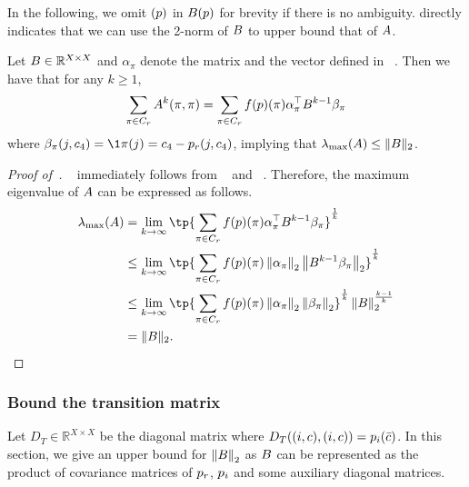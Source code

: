 \documentclass[a4paper,11pt]{article}
\renewcommand{\norm}[1]{\left\|#1\right\|}
\begin{document}
In the following, we omit $(\*p)$ in $\*B(\*p)$ for brevity if there is no ambiguity.  directly indicates that we can use the 2-norm of $\*B$ to upper bound that of $\*A$.
\begin{lemma}\label{lem:convert_A_to_B}
    Let $\*B \in \mathbb R^{X\times X}$ and $\alpha_\pi$ denote the matrix and the vector defined in ~.
    Then we have that for any $k\geq 1$,
    \begin{align}\label{eq:lem8}
        \sum_{\pi\in C_r}\*A^k(\pi,\pi)
        = \sum_{\pi\in C_r}f(\*p)(\pi)\alpha_\pi^\top \*B^{k-1}\beta_\pi
    \end{align}
    where $\beta_\pi(j,c_4) = \1{\pi(j) = c_4} - \*p_r(j,c_4)$, implying that $\lambda_{\max}(\*A) \leq \|\*B\|_2$.
\end{lemma}
\begin{proof}[Proof of~]
    ~ immediately follows from ~ and ~.
    Therefore, the maximum eigenvalue of $\*A$ can be expressed as follows.
    \begin{align*}
        \lambda_{\max}(\*A) &= \lim_{k\to \infty}\tp{\sum_{\pi\in C_r}f(\*p)(\pi)\alpha_\pi^\top \*B^{k-1}\beta_\pi}^{\frac 1k}
        \\&\leq \lim_{k\to \infty}\tp{\sum_{\pi\in C_r}f(\*p)(\pi)\norm{\alpha_\pi}_2 \norm{\*B^{k-1}\beta_\pi}_2}^{\frac 1k}
        \\&\leq \lim_{k\to \infty}\tp{\sum_{\pi\in C_r}f(\*p)(\pi)\norm{\alpha_\pi}_2 \norm{\beta_\pi}_2}^{\frac 1k} \norm{\*B}_2^{\frac{k-1}{k}}
        \\&= \|\*B\|_2.
    \end{align*}
\end{proof}
\subsubsection{Bound the transition matrix} \label{sec:bound_Jac}
Let $D_T\in \mathbb{R}^{X\times X}$ be the diagonal matrix where $D_T((i,c),(i,c)) = \*p_i(\bar{c})$.
In this section, we give an upper bound for $\norm{\*B}_2$ as $\*B$ can be represented as the product of covariance matrices of $\*p_r$, $\*p_i$ and some auxiliary diagonal matrices.
\end{document}
